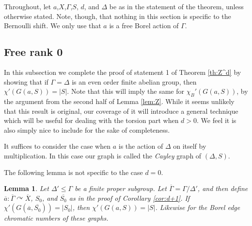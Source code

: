 \documentclass[12pt]{article}
\newcommand{\0}{\varnothing}
\newtheorem{lemma}{Lemma}
\begin{document}
Throughout, let $a$,$X$,$\Gamma$,$S$, $d$, and $\Delta$ be as in the statement of the theorem, unless otherwise stated. Note, though, that nothing in this section is specific to the Bernoulli shift. We only use that $a$ is a free Borel action of $\Gamma$.

\subsection{Free rank 0}

In this subsection we complete the proof of statement 1 of Theorem \ref{th:Z^d} by showing that if $\Gamma = \Delta$ is an even order finite abelian group, then $\chi'(G(a,S)) = |S|$. Note that this will imply the same for $\chi_B'(G(a,S))$, by the argument from the second half of Lemma \ref{lem:Z}. While it seems unlikely that this result is original, our coverage of it will introduce a general technique which will be useful for dealing with the torsion part when $d > 0$. We feel it is also simply nice to include for the sake of completeness. 

It suffices to consider the case when $a$ is the action of $\Delta$ on itself by multiplication. In this case our graph is called the \textit{Cayley} graph of $(\Delta,S)$. 

The following lemma is not specific to the case $d=0$.

\begin{lemma}\label{lem:quotient}
Let $\Delta' \leq \Gamma$ be a finite proper subgroup. Let $\overline{\Gamma} = \Gamma/\Delta'$, and then define $\overline{a}:\overline{\Gamma} \curvearrowright \overline{X}$, $S_0$, and $\overline{S_0}$ as in the proof of Corollary \ref{cor:d+1}. If $\chi'(G(\overline{a},\overline{S_0})) = |{S_0}|$, then $\chi'(G(a,S)) = |S|$. Likewise for the Borel edge chromatic numbers of these graphs.
\end{lemma}
\end{document}
